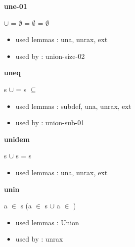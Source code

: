 \documentclass[a4paper]{article}
\begin{document}
\medskip

\bigskip

{\large\bf une-01}

\medskip

 \Fol {} $\cup$  = $\emptyset$ \Equiv {} = $\emptyset$ \And {} = $\emptyset$

\begin{itemize}


\item       used lemmas  : una, unrax, ext
\item       used by      : union-size-02

\end{itemize}

\medskip

\bigskip

{\large\bf uneq}

\medskip

 \Fol s $\cup$  =  \Equiv s $\subseteq$ 

\begin{itemize}


\item       used lemmas  : subdef, una, unrax, ext
\item       used by      : union-sub-01

\end{itemize}

\medskip

\bigskip

{\large\bf unidem}

\medskip

 \Fol s $\cup$ s = s

\begin{itemize}


\item       used lemmas  : una, unrax, ext

\end{itemize}

\medskip

\bigskip

{\large\bf unin}

\medskip

 \Fol \Not a $\in$ s \Imp (a $\in$ s $\cup$  \Equiv a $\in$ )

\begin{itemize}


\item       used lemmas  : Union
\item       used by      : unrax

\end{itemize}
\end{document}

